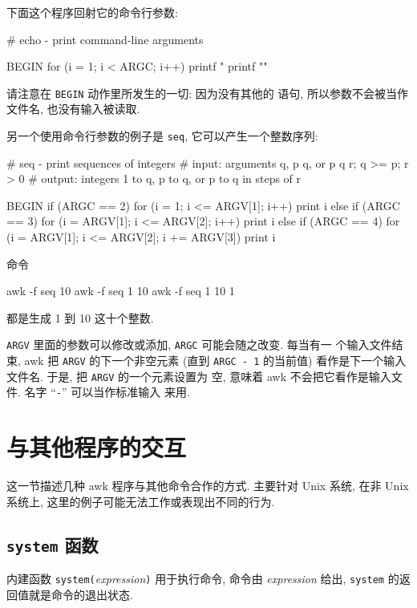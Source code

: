 下面这个程序回射它的命令行参数:
\begin{myverb}
    # echo - print command-line arguments

    BEGIN {
        for (i = 1; i < ARGC; i++)
            printf "%
        printf "\n"
    }
\end{myverb}
请注意在 \verb'BEGIN' 动作里所发生的一切: 因为没有其他的 \patact 语句,
所以参数不会被当作文件名, 也没有输入被读取.

另一个使用命令行参数的例子是 \verb'seq', 它可以产生一个整数序列:
\begin{myverb}
    # seq - print sequences of integers
    # input:  arguments q, p q, or p q r;  q >= p; r > 0
    # output: integers 1 to q, p to q, or p to q in steps of r

    BEGIN {
        if (ARGC == 2)
            for (i = 1; i <= ARGV[1]; i++)
                print i
        else if (ARGC == 3)
            for (i = ARGV[1]; i <= ARGV[2]; i++)
                print i
        else if (ARGC == 4)
            for (i = ARGV[1]; i <= ARGV[2]; i += ARGV[3])
                print i
    }
\end{myverb}
命令
\begin{myverb}
    awk -f seq 10
    awk -f seq 1 10
    awk -f seq 1 10 1
\end{myverb}
都是生成 1 到 10 这十个整数.

\verb'ARGV' 里面的参数可以修改或添加, \verb'ARGC' 可能会随之改变. 每当有一
个输入文件结束, awk 把 \verb'ARGV' 的下一个非空元素 (直到 \verb'ARGC - 1'
的当前值) 看作是下一个输入文件名. 于是, 把 \verb'ARGV' 的一个元素设置为
空, 意味着 awk 不会把它看作是输入文件. 名字 ``\verb"-"'' 可以当作标准输入
来用.

\section{与其他程序的交互}
\label{sec:interaction_with_other_programs}

这一节描述几种 awk 程序与其他命令合作的方式. 主要针对 Unix 系统, 在非
Unix 系统上, 这里的例子可能无法工作或表现出不同的行为.

\subsection{\textbf{\texttt{system}} 函数}
\label{subsec:the_system_function}

内建函数 \verb'system('\textit{expression}\verb')' 用于执行命令, 命令由
\textit{expression} 给出, \verb'system' 的返回值就是命令的退出状态.

